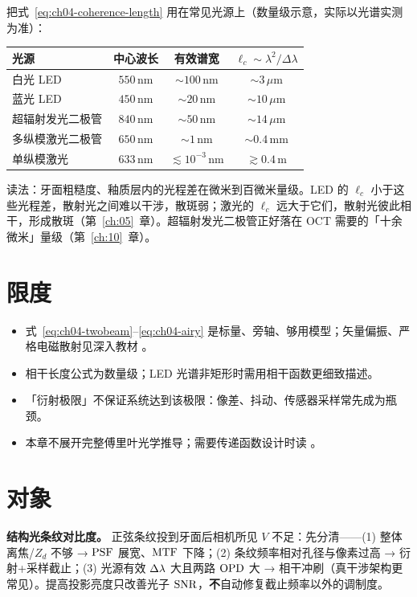 把式~\eqref{eq:ch04-coherence-length} 用在常见光源上（数量级示意，实际以光谱实测为准）：
\begin{center}
\small
\begin{tabular}{@{}lccc@{}}
  \toprule
  光源 & 中心波长 & 有效谱宽 & $\ell_c\sim\lambda^2/\Delta\lambda$ \\
  \midrule
  白光 LED & $550\,\mathrm{nm}$ & $\sim100\,\mathrm{nm}$ & $\sim3\,\mu\mathrm{m}$ \\
  蓝光 LED & $450\,\mathrm{nm}$ & $\sim20\,\mathrm{nm}$ & $\sim10\,\mu\mathrm{m}$ \\
  超辐射发光二极管 & $840\,\mathrm{nm}$ & $\sim50\,\mathrm{nm}$ & $\sim14\,\mu\mathrm{m}$ \\
  多纵模激光二极管 & $650\,\mathrm{nm}$ & $\sim1\,\mathrm{nm}$ & $\sim0.4\,\mathrm{mm}$ \\
  单纵模激光 & $633\,\mathrm{nm}$ & $\lesssim10^{-3}\,\mathrm{nm}$ & $\gtrsim0.4\,\mathrm{m}$ \\
  \bottomrule
\end{tabular}
\end{center}
读法：牙面粗糙度、釉质层内的光程差在微米到百微米量级。LED 的 $\ell_c$ 小于这些光程差，散射光之间难以干涉，散斑弱；激光的 $\ell_c$ 远大于它们，散射光彼此相干，形成散斑（第~\ref{ch:05}~章）。超辐射发光二极管正好落在 OCT 需要的「十余微米」量级（第~\ref{ch:10}~章）。

\section{限度}
\label{sec:ch03-limits}

\begin{itemize}
  \item 式~\eqref{eq:ch04-twobeam}--\eqref{eq:ch04-airy} 是标量、旁轴、够用模型；矢量偏振、严格电磁散射见深入教材 \citep{BornWolf}。
  \item 相干长度公式为数量级；LED 光谱非矩形时需用相干函数更细致描述。
  \item 「衍射极限」不保证系统达到该极限：像差、抖动、传感器采样常先成为瓶颈。
  \item 本章不展开完整傅里叶光学推导；需要传递函数设计时读 \cite{GoodmanFourierOptics}。
\end{itemize}

\section{对象}
\label{sec:ch03-object}

\textbf{结构光条纹对比度。} 正弦条纹投到牙面后相机所见 $V$ 不足：先分清——(1) 整体离焦/$Z_d$ 不够 → $\mathrm{PSF}$ 展宽、$\mathrm{MTF}$ 下降；(2) 条纹频率相对孔径与像素过高 → 衍射+采样截止；(3) 光源有效 $\Delta\lambda$ 大且两路 $\mathrm{OPD}$ 大 → 相干冲刷（真干涉架构更常见）。提高投影亮度只改善光子 $\mathrm{SNR}$，\textbf{不}自动修复截止频率以外的调制度。

